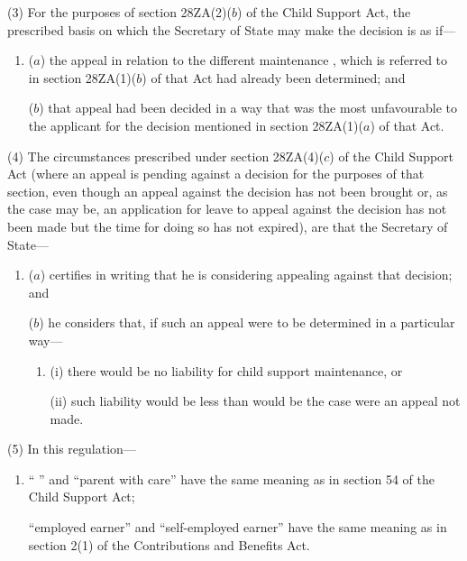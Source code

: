 \documentclass[12pt,a4paper]{article}
\begin{document}
(3) For the purposes of section 28ZA(2)($b$) of the Child Support Act, the prescribed basis on which the Secretary of State may make the decision is as if—
\begin{enumerate}\item[]
($a$) the appeal in relation to the different maintenance 
%
, which is referred to in section 28ZA(1)($b$) of that Act had already been determined; and

($b$) that appeal had been decided in a way that was the most unfavourable to the applicant for the decision mentioned in section 28ZA(1)($a$) of that Act.
\end{enumerate}

(4) The circumstances prescribed under section 28ZA(4)($c$) of the Child Support Act (where an appeal is pending against a decision for the purposes of that section, even though an appeal against the decision has not been brought or, as the case may be, an application for leave to appeal against the decision has not been made but the time for doing so has not expired), are that the Secretary of State—
\begin{enumerate}\item[]
($a$) certifies in writing that he is considering appealing against that decision; and

($b$) he considers that, if such an appeal were to be determined in a particular way—
\begin{enumerate}\item[]
(i) there would be no liability for child support maintenance, or

(ii) such liability would be less than would be the case were an appeal not made.
\end{enumerate}
\end{enumerate}

(5) In this regulation—
\begin{enumerate}\item[]
“%
” and “parent with care” have the same meaning as in section 54 of the Child Support Act;

“employed earner” and “self-employed earner” have the same meaning as in section 2(1) of the Contributions and Benefits Act.
\end{enumerate}
\end{document}
